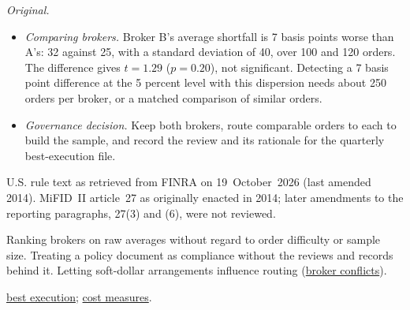 \begin{qfmethod}
 \emph{Original.}
\begin{itemize}
\item \emph{Comparing brokers.} Broker B's average shortfall is 7 basis points worse than A's: 32 against 25, with a standard deviation of 40, over 100 and 120 orders. The difference gives $t=1.29$ ($p=0.20$), not significant. Detecting a 7 basis point difference at the 5 percent level with this dispersion needs about 250 orders per broker, or a matched comparison of similar orders.
\item \emph{Governance decision.} Keep both brokers, route comparable orders to each to build the sample, and record the review and its rationale for the quarterly best-execution file.
\end{itemize}

 U.S. rule text as retrieved from FINRA on 19~October~2026 (last amended 2014). MiFID~II article~27 as originally enacted in 2014; later amendments to the reporting paragraphs, 27(3) and (6), were not reviewed.

 Ranking brokers on raw averages without regard to order difficulty or sample size. Treating a policy document as compliance without the reviews and records behind it. Letting soft-dollar arrangements influence routing (\hyperref[def:broker-agency-conflicts]{broker conflicts}).

 \hyperref[def:best-execution]{best execution}; \hyperref[meth:execution-cost-measures]{cost measures}.

\end{qfmethod}
